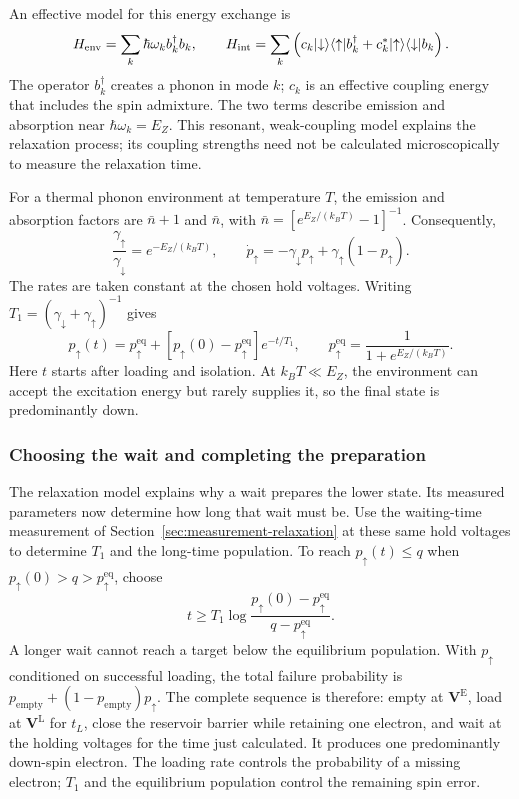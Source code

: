 An effective model for this energy exchange is
\[
 H_{\mathrm{env}}=\sum_k\hbar\omega_k b_k^\dagger b_k,\qquad
 H_{\mathrm{int}}=\sum_k
 \left(c_k\lvert \downarrow\rangle\langle \uparrow\rvert b_k^\dagger
       +c_k^*\lvert \uparrow\rangle\langle \downarrow\rvert b_k\right).
\]
The operator $b_k^\dagger$ creates a phonon in mode $k$;
$c_k$ is an effective coupling energy that includes the spin
admixture. The two terms describe emission and absorption near
$\hbar\omega_k=E_Z$. This resonant, weak-coupling model explains
the relaxation process; its coupling strengths need not be
calculated microscopically to measure the relaxation time.

For a thermal phonon environment at temperature $T$, the emission
and absorption factors are $\bar n+1$ and $\bar n$, with
$\bar n=[e^{E_Z/(k_BT)}-1]^{-1}$. Consequently,
\[
 \frac{\gamma_\uparrow}{\gamma_\downarrow}=e^{-E_Z/(k_BT)},\qquad
 \dot p_\uparrow=-\gamma_\downarrow p_\uparrow
                         +\gamma_\uparrow(1-p_\uparrow).
\]
The rates are taken constant at the chosen hold voltages.
Writing $T_1=(\gamma_\downarrow+\gamma_\uparrow)^{-1}$ gives
\begin{equation}
 p_\uparrow(t)=p_\uparrow^{\mathrm{eq}}
   +[p_\uparrow(0)-p_\uparrow^{\mathrm{eq}}]e^{-t/T_1},
 \qquad
 p_\uparrow^{\mathrm{eq}}=\frac{1}{1+e^{E_Z/(k_BT)}}.
 \label{eq:calibration-initialization-wait}
\end{equation}
Here $t$ starts after loading and isolation. At $k_BT\ll E_Z$,
the environment can accept the excitation energy but rarely
supplies it, so the final state is predominantly down.

\subsubsection{Choosing the wait and completing the preparation}
The relaxation model explains why a wait prepares the lower state.
Its measured parameters now determine how long that wait must be.
Use the waiting-time measurement of
Section~\ref{sec:measurement-relaxation} at these same hold
voltages to determine $T_1$ and the long-time population.
To reach $p_\uparrow(t)\le q$ when
$p_\uparrow(0)>q>p_\uparrow^{\mathrm{eq}}$, choose
\[
 t\ge T_1\log
 \frac{p_\uparrow(0)-p_\uparrow^{\mathrm{eq}}}
      {q-p_\uparrow^{\mathrm{eq}}}.
\]
A longer wait cannot reach a target below the equilibrium
population. With $p_\uparrow$ conditioned on successful loading,
the total failure probability is
$p_{\mathrm{empty}}+(1-p_{\mathrm{empty}})p_\uparrow$.
The complete sequence is therefore: empty at $\mathbf V^{\mathrm E}$,
load at $\mathbf V^{\mathrm L}$ for $t_L$, close the reservoir barrier
while retaining one electron, and wait at the holding voltages for
the time just calculated. It produces one predominantly down-spin
electron. The loading rate controls the probability of a missing
electron; $T_1$ and the equilibrium population control the remaining
spin error.

